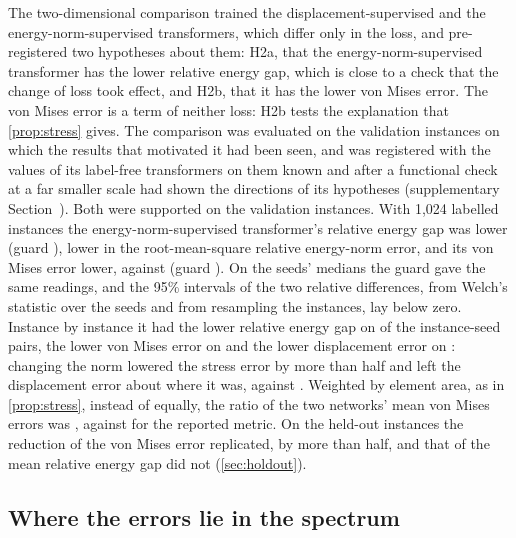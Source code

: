 

The two-dimensional comparison trained the displacement-supervised and the
energy-norm-supervised transformers, which differ only in the loss, and pre-registered two
hypotheses about them: H2a, that the energy-norm-supervised transformer has the lower
relative energy gap, which is close to a check that the change of loss took effect, and H2b,
that it has the lower von Mises error. The von Mises error is a term of neither loss: H2b
tests the explanation that \cref{prop:stress} gives. The comparison was evaluated on the
validation instances on which the results that motivated it had been seen, and was
registered with the values of its label-free transformers on them known and after a
functional check at a far smaller scale had shown the directions of its hypotheses
(supplementary Section~\SuppPrereg{}). Both were supported on the validation instances. With
1,024 labelled instances the energy-norm-supervised transformer's relative energy gap was
\numHTwoARel{} lower (guard \numHTwoATau{}), \numHTwoARootRel{} lower in the
root-mean-square relative energy-norm error, and its von Mises error \numHTwoBRel{} lower,
\numCmKnormVm{} against \numCmLabVm{} (guard \numHTwoBTau{}). On the seeds' medians the
guard gave the same readings, and the 95\% intervals of the two relative differences, from
Welch's statistic over the seeds and from resampling the instances, lay below zero. Instance
by instance it had the lower relative energy gap on \numPairCmKnormLabGap{} of the
instance-seed pairs, the lower von Mises error on \numPairCmKnormLabVm{} and the lower
displacement error on \numPairCmKnormLabDisp{}: changing the norm lowered the stress error
by more than half and left the displacement error about where it was, \numCmKnormDisp{}
against \numCmLabDisp{}. Weighted by element area, as in \cref{prop:stress}, instead of
equally, the ratio of the two networks' mean von Mises errors was \numSpecVmAreaRatio{},
against \numSpecVmElemRatio{} for the reported metric. On the held-out instances the
reduction of the von Mises error replicated, by more than half, and that of the mean
relative energy gap did not (\cref{sec:holdout}).

\subsection{Where the errors lie in the spectrum}\label{sec:norm:spectrum}

